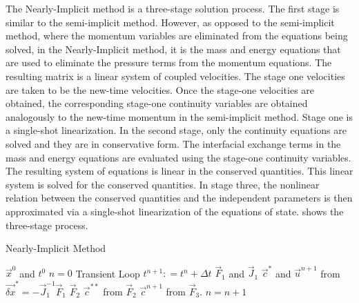 The Nearly-Implicit method is a three-stage solution process.
The first stage is similar to the semi-implicit method.
However, as opposed to the semi-implicit method, where the momentum variables are eliminated from the equations being solved, in the Nearly-Implicit method, it is the mass and energy equations that are used to eliminate the pressure terms from the momentum equations.
The resulting matrix is a linear system of coupled velocities.
The stage one velocities are taken to be the new-time velocities.
Once the stage-one velocities are obtained, the corresponding stage-one continuity variables are obtained analogously to the new-time momentum in the semi-implicit method.
Stage one is a single-shot linearization.
In the second stage, only the continuity equations are solved and they are in conservative form.
The interfacial exchange terms in the mass and energy equations are evaluated using the stage-one continuity variables.
The resulting system of equations is linear in the conserved quantities.
This linear system is solved for the conserved quantities.
In stage three, the nonlinear relation between the conserved quantities and the independent parameters is then approximated via a single-shot linearization of the equations of state.
 shows the three-stage process.

\begin{algo}[H]
\caption{Nearly-Implicit Method}
\label{alg:ni}
\setlength{\baselineskip}{0.625\baselineskip}
\begin{algorithmic}[1]
\Require $\vec{x}^{0}$ and $t^{0}$
\Set $n = 0$
\Loop \; Transient Loop
    \State $t^{n+1} : = t^{n} + \Delta t$
	\Calculate $\vec{F}_1$ and $\vec{J}_1$
	\Calculate $\vec{c}^{*}$ and $\vec{u}^{n+1}$ from $\vec{\delta x}^{*} = -\vec{J}^{-1}_1\vec{F}_1$
	\Calculate $\vec{F}_2$
	\Calculate $\vec{c}^{**}$ from $\vec{F}_2$
	\Calculate $\vec{c}^{n+1}$ from $\vec{F}_3$.
	\State $n = n + 1$
\EndLoop
\end{algorithmic}
\end{algo}

